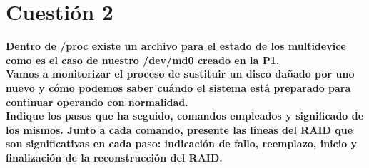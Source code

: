 \documentclass[a4paper,10pt]{article}
\newenvironment{answer}{%
\begin{list}{}{%
}%
\item[]}{\end{list}}
\begin{document}
\section{Cuestión 2}
\textbf{Dentro de /proc existe un archivo para el estado de los multidevice como es el caso de
nuestro /dev/md0 creado en la P1.\\
Vamos a monitorizar el proceso de sustituir un disco dañado por uno nuevo y cómo
podemos saber cuándo el sistema está preparado para continuar operando con
normalidad.\\
Indique los pasos que ha seguido, comandos empleados y significado de los mismos. Junto a cada comando, presente las líneas
del RAID que son significativas en cada paso: indicación de fallo, reemplazo, inicio y finalización de la reconstrucción del RAID.}
\begin{answer}
 
\end{answer}
\end{document}
